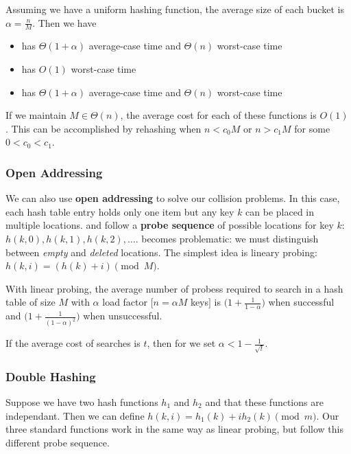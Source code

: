\documentclass[12pt]{article}
\begin{document}
Assuming we have a uniform hashing function, the average size of each bucket is $\alpha = \frac{n}{M}$. Then we have
\begin{itemize}
\item {} has $\Theta(1+\alpha)$ average-case time and $\Theta(n)$ worst-case time
\item {} has $O(1)$ worst-case time
\item {} has $\Theta(1+\alpha)$ average-case time and $\Theta(n)$ worst-case time
\end{itemize}

If we maintain $M \in \Theta(n)$, the average cost for each of these functions is $O(1)$. This can be accomplished by rehashing when $n < c_0M$ or $n > c_1M$ for some $0 < c_0 < c_1$.

\subsubsection{Open Addressing}
We can also use {\bf open addressing} to solve our collision problems. In this case, each hash table entry holds only one item but any key $k$ can be placed in multiple locations.  and  follow a {\bf probe sequence} of possible locations for key $k$: $h(k,0), h(k,1), h(k,2), \dots$.  becomes problematic: we must distinguish between \emph{empty} and \emph{deleted} locations. The simplest idea is lineary probing: $h(k,i) = (h(k) + i) \pmod M$.

\begin{theorem}
With linear probing, the average number of probess required to search in a hash table of size $M$ with $\alpha$ load factor $[n = \alpha M$ keys$]$ is \half $\bigl(1 + \frac{1}{1-\alpha}\bigl)$ when successful and \half $\bigl(1 + \frac{1}{{(1-\alpha)}^2}\bigl)$ when unsuccessful.

If the average cost of searches is $t$, then for we set $\alpha < 1 - \frac{1}{\sqrt{t}}$.
\end{theorem}

\subsubsection{Double Hashing}
Suppose we have two hash functions $h_1$ and $h_2$ and that these functions are independant. Then we can define $h(k,i) = h_1(k) + ih_2(k) \pmod m$. Our three standard functions work in the same way as linear probing, but follow this different probe sequence.
\end{document}
